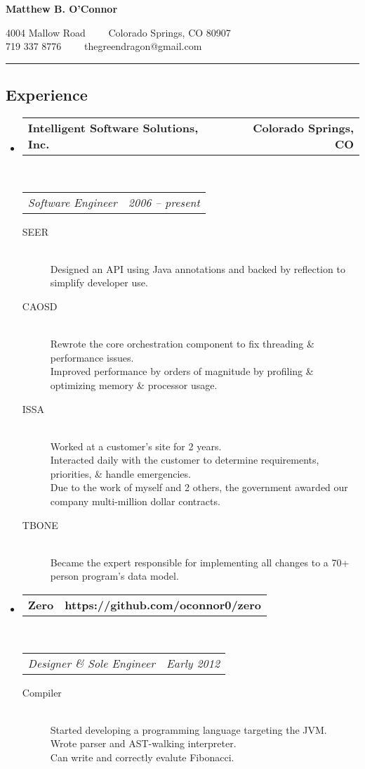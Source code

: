 \documentclass[10pt,letterpaper]{article}
\makeatletter
\newcommand{\headerrow}[2]
{\begin{tabular*}{\linewidth}{l@{\extracolsep{\fill}}r}
	#1 &
	#2 \\
\end{tabular*}}
\makeatother
\begin{document}
\begin{center}
{\LARGE \textbf{Matthew B. O'Connor}}

4004 Mallow Road\ \ \textbullet
\ \ Colorado Springs, CO 80907
\\
719 337 8776\ \ \textbullet
\ \ thegreendragon@gmail.com
\end{center}

\hrule
\vspace{-0.4em}
\subsection*{Experience}

\begin{itemize}
	\parskip=0.1em

	\item
	\headerrow
		{\textbf{Intelligent Software Solutions, Inc.}}
		{\textbf{Colorado Springs, CO}}
	\\
	\headerrow
		{\emph{Software Engineer}}
		{\emph{2006 -- present}}
	\begin{description}
		\item[SEER] \hfill \\
				Designed an API using Java annotations and backed by reflection to simplify developer use.
		\item[CAOSD] \hfill \\
				Rewrote the core orchestration component to fix threading \& performance issues. \\
				Improved performance by orders of magnitude by profiling \& optimizing memory \& processor usage.
		\item[ISSA] \hfill \\
				Worked at a customer's site for 2  years. \\
				Interacted daily with the customer to determine requirements, priorities, \& handle emergencies. \\
				Due to the work of myself and 2 others, the government awarded our company multi-million dollar contracts.
		\item[TBONE] \hfill \\
				Became the expert responsible for implementing all changes to a 70+ person program's data model.
	\end{description}

	\item
	\headerrow
		{\textbf{Zero}}
		{\textbf{https://github.com/oconnor0/zero}}
	\\
	\headerrow
		{\emph{Designer \& Sole Engineer}}
		{\emph{Early 2012}}
	\begin{description}
		\item[Compiler] \hfill \\
			Started developing a programming language targeting the JVM. \\
			Wrote parser and AST-walking interpreter. \\
			Can write and correctly evalute Fibonacci.
	\end{description}

\end{itemize}
\end{document}
